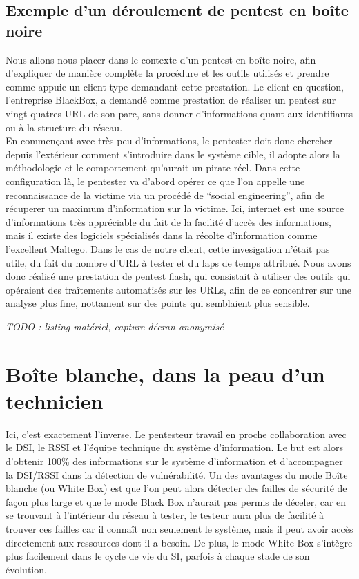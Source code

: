 \documentclass[a4paper]{memoir}
\begin{document}
\subsection{Exemple d'un déroulement de pentest en boîte noire}

Nous allons nous placer dans le contexte d'un pentest en boîte noire, afin d'expliquer de manière complète la procédure et les outils utilisés et prendre comme appuie un client type demandant cette prestation. Le client en question, l'entreprise BlackBox, a demandé comme prestation de réaliser un pentest sur vingt-quatres URL de son parc, sans donner d'informations quant aux identifiants ou à la structure du réseau.\\

En commençant avec très peu d’informations, le pentester doit donc chercher depuis l’extérieur comment s’introduire dans le système cible, il adopte alors la méthodologie et le comportement qu’aurait un pirate réel. 
Dans cette configuration là, le pentester va d'abord opérer ce que l'on appelle une reconnaissance de la victime via un procédé de ``social engineering'', afin de récuperer un maximum d'information sur la victime. Ici, internet est une source d'informations très appréciable du fait de la facilité d'accès des informations, mais il existe des logiciels spécialisés dans la récolte d'information comme l'excellent Maltego.
Dans le cas de notre client, cette invesigation n'était pas utile, du fait du nombre d'URL à tester et du laps de temps attribué. Nous avons donc réalisé une prestation de pentest flash, qui consistait à utiliser des outils qui opéraient des traîtements automatisés sur les URLs, afin de ce concentrer sur une analyse plus fine, nottament sur des points qui semblaient plus sensible.

\textit{TODO : listing matériel, capture décran anonymisé}   



\section{Boîte blanche, dans la peau d'un technicien}

 Ici, c’est exactement l’inverse. Le pentesteur travail en proche collaboration avec le DSI, le RSSI et l’équipe technique du système d’information. Le but est alors d’obtenir 100\% des informations sur le système d’information et d’accompagner la DSI/RSSI dans la détection de vulnérabilité. Un des avantages du mode Boîte blanche (ou White Box) est que l’on peut alors détecter des failles de sécurité de façon plus large et que le mode Black Box n’aurait pas permis de déceler, car en se trouvant à l'intérieur du réseau à tester, le testeur aura plus de facilité à trouver ces failles car il connaît non seulement le système, mais il peut avoir accès directement aux ressources dont il a besoin. De plus, le mode White Box s’intègre plus facilement dans le cycle de vie du SI, parfois à chaque stade de son évolution. 
\end{document}
